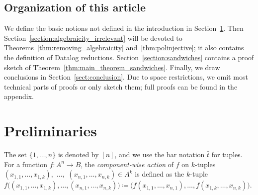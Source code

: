 \subsection{Organization of this article}
We define the basic notions not defined in the introduction in Section~\ref{section:preliminaries}. Then Section~\ref{section:algebraicity_irrelevant} will be devoted to Theorems~\ref{thm:removing_algebraicity} and~\ref{thm:polinjective}; it also contains the definition of Datalog reductions. Section~\ref{section:sandwiches} contains a proof sketch of Theorem~\ref{thm:main_theorem_sandwiches}. Finally, we draw conclusions 
 in Section~\ref{sect:conclusion}. Due to space restrictions, we omit most technical parts of proofs or only sketch them; full proofs can be found in the appendix.

  
\section{Preliminaries} \label{section:preliminaries} 

The set $\{1,\dots,n\}$ is denoted by $[n]$, and we use the bar notation $\bar{t}$ for tuples.
%
For a function $f\colon A^n \rightarrow B$, the \emph{component-wise action} of $f$ on $k$-tuples $(x_{1,1},\dots, x_{1,k}),$ $\dots,$ $(x_{n,1},\dots, x_{n,k})  \in A^{k}$ is defined as the $k$-tuple $f\big((x_{1,1},\dots, x_{1,k}),\dots, (x_{n,1},\dots, x_{n,k}) \big)\coloneqq \big(f(x_{1,1},\dots,x_{n,1}),\dots, f(x_{1,k},\dots,x_{n,k}) \big)$.

